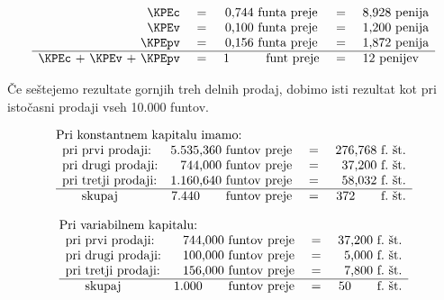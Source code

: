 \documentclass[kapital_02.tex]{subfiles}
\begin{document}
\[
    \begin{array}{r c c c l}
        \KPEc & \textrm{ = } & \textrm{0,744 funta preje} & \textrm{ = } & \textrm{8,928 penija} \\
        \KPEv & \textrm{ = } & \textrm{0,100 funta preje} & \textrm{ = } & \textrm{1,200 penija} \\
        \KPEpv & \textrm{ = } & \textrm{0,156 funta preje} & \textrm{ = } & \textrm{1,872 penija} \\
        \hline
        \KPEc \textrm{ + } \KPEv \textrm{ + } \KPEpv & \textrm{ = } & \textrm{1 } \phantom{--..} \textrm{funt preje} & \textrm{ = } & \textrm{12 penijev} \\
    \end{array}
\]

Če seštejemo rezultate gornjih treh delnih prodaj, dobimo isti rezultat kot pri istočasni prodaji vseh 10.000 funtov.

\[
    \begin{array}{l}
        \textrm{Pri konstantnem kapitalu imamo:} \\
        \begin{array}{l r c r}
            \textrm{pri prvi prodaji:} & \textrm{5.535,360 funtov preje} & \textrm{ = } & \textrm{276,768~f.~št.} \\
            \textrm{pri drugi prodaji:} & \textrm{744,000 funtov preje} & \textrm{ = }  & \textrm{37,200~f.~št.} \\
            \textrm{pri tretji prodaji:} & \textrm{1.160,640 funtov preje} & \textrm{ = } & \textrm{58,032~f.~št.} \\
            \hline
            \phantom{--} \textrm{skupaj} & \textrm{7.440} \phantom{--} \thinspace \thinspace \thinspace \textrm{funtov preje} & \textrm{=} & \textrm{372} \phantom{--} \thinspace \textrm{~f.~št.} \\
        \end{array} \\
    \end{array}
\]

\[
    \begin{array}{l}
        \textrm{Pri variabilnem kapitalu:} \\
        \begin{array}{l r c r}
            \textrm{pri prvi prodaji:} & \textrm{744,000 funtov preje} & \textrm{ = } & \textrm{37,200~f.~št.} \\
            \textrm{pri drugi prodaji:} & \textrm{100,000 funtov preje} & \textrm{ = } & \textrm{5,000~f.~št.} \\
            \textrm{pri tretji prodaji:} & \textrm{156,000 funtov preje} & \textrm{ = } & \textrm{7,800~f.~št.} \\
            \hline
            \phantom{--} \textrm{skupaj} & \textrm{1.000} \phantom{--} \thinspace \thinspace \thinspace \textrm{funtov preje} & \textrm{ = } & \textrm{50} \phantom{--} \thinspace \textrm{~f.~št.} \\
        \end{array} \\
    \end{array}
\]
\end{document}
